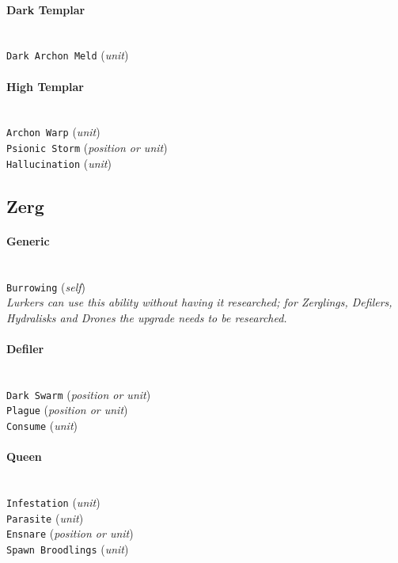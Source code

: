 \paragraph{Dark Templar} \mbox{}\\
\verb|Dark Archon Meld| (\textit{unit})

\paragraph{High Templar} \mbox{}\\
\verb|Archon Warp| (\textit{unit}) \\
\verb|Psionic Storm| (\textit{position or unit}) \\
\verb|Hallucination| (\textit{unit})

\subsection{Zerg}

\paragraph{Generic} \mbox{}\\
\verb|Burrowing| (\textit{self}) \\
\textit{Lurkers can use this ability without having it researched; for Zerglings, Defilers, Hydralisks and Drones the upgrade needs to be researched.}

\paragraph{Defiler} \mbox{}\\
\verb|Dark Swarm| (\textit{position or unit}) \\
\verb|Plague| (\textit{position or unit}) \\
\verb|Consume| (\textit{unit}) 

\paragraph{Queen} \mbox{}\\
\verb|Infestation| (\textit{unit}) \\
\verb|Parasite| (\textit{unit}) \\
\verb|Ensnare| (\textit{position or unit}) \\
\verb|Spawn Broodlings| (\textit{unit})

